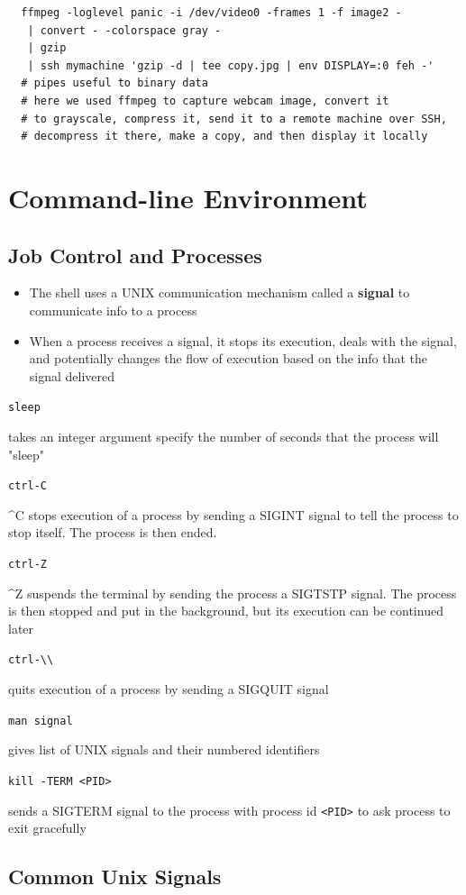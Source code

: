 \documentclass[letterpaper,12pt]{article}
\newcommand*{\lstitem}[1]{
  \setbox0\hbox{\lstinline{#1}}
  \item[\usebox0]
}
\begin{document}
\begin{lstlisting}
  ffmpeg -loglevel panic -i /dev/video0 -frames 1 -f image2 -
   | convert - -colorspace gray -
   | gzip
   | ssh mymachine 'gzip -d | tee copy.jpg | env DISPLAY=:0 feh -'
  # pipes useful to binary data
  # here we used ffmpeg to capture webcam image, convert it
  # to grayscale, compress it, send it to a remote machine over SSH,
  # decompress it there, make a copy, and then display it locally
\end{lstlisting}

\section{Command-line Environment}

\subsection{Job Control and Processes}
\begin{itemize}
 \item The shell uses a UNIX communication mechanism called a \textbf{signal} to communicate info to a process
 \item When a process receives a signal, it stops its execution, deals with the signal, and potentially changes the flow of execution based on the info that the signal delivered
\end{itemize}

\begin{description}
 \lstitem{sleep} takes an integer argument specify the number of seconds that the process will "sleep"
 \lstitem{ctrl-C} \^{}C stops execution of a process  by sending a SIGINT signal to tell the process to stop itself. The process is then ended.
 \lstitem{ctrl-Z} \^{}Z suspends the terminal by sending the process a SIGTSTP signal. The process is then stopped and put in the background, but its execution can be continued later
 \lstitem{ctrl-\\} quits execution of a process by sending a SIGQUIT signal
 \lstitem{man signal} gives list of UNIX signals and their numbered identifiers
 \lstitem{kill -TERM <PID>} sends a SIGTERM signal to the process with process id \lstinline{<PID>} to ask process to exit gracefully
\end{description}

\subsection{Common Unix Signals}
\end{document}
